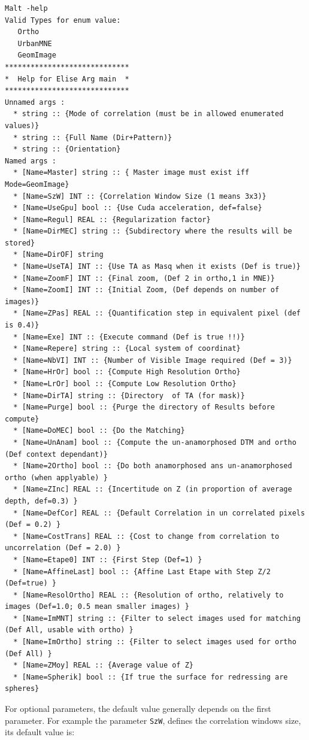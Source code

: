 {\scriptsize
\begin{verbatim}
Malt -help
Valid Types for enum value:
   Ortho
   UrbanMNE
   GeomImage
*****************************
*  Help for Elise Arg main  *
*****************************
Unnamed args :
  * string :: {Mode of correlation (must be in allowed enumerated values)}
  * string :: {Full Name (Dir+Pattern)}
  * string :: {Orientation}
Named args :
  * [Name=Master] string :: { Master image must exist iff Mode=GeomImage}
  * [Name=SzW] INT :: {Correlation Window Size (1 means 3x3)}
  * [Name=UseGpu] bool :: {Use Cuda acceleration, def=false}
  * [Name=Regul] REAL :: {Regularization factor}
  * [Name=DirMEC] string :: {Subdirectory where the results will be stored}
  * [Name=DirOF] string
  * [Name=UseTA] INT :: {Use TA as Masq when it exists (Def is true)}
  * [Name=ZoomF] INT :: {Final zoom, (Def 2 in ortho,1 in MNE)}
  * [Name=ZoomI] INT :: {Initial Zoom, (Def depends on number of images)}
  * [Name=ZPas] REAL :: {Quantification step in equivalent pixel (def is 0.4)}
  * [Name=Exe] INT :: {Execute command (Def is true !!)}
  * [Name=Repere] string :: {Local system of coordinat}
  * [Name=NbVI] INT :: {Number of Visible Image required (Def = 3)}
  * [Name=HrOr] bool :: {Compute High Resolution Ortho}
  * [Name=LrOr] bool :: {Compute Low Resolution Ortho}
  * [Name=DirTA] string :: {Directory  of TA (for mask)}
  * [Name=Purge] bool :: {Purge the directory of Results before compute}
  * [Name=DoMEC] bool :: {Do the Matching}
  * [Name=UnAnam] bool :: {Compute the un-anamorphosed DTM and ortho (Def context dependant)}
  * [Name=2Ortho] bool :: {Do both anamorphosed ans un-anamorphosed ortho (when applyable) }
  * [Name=ZInc] REAL :: {Incertitude on Z (in proportion of average depth, def=0.3) }
  * [Name=DefCor] REAL :: {Default Correlation in un correlated pixels (Def = 0.2) }
  * [Name=CostTrans] REAL :: {Cost to change from correlation to uncorrelation (Def = 2.0) }
  * [Name=Etape0] INT :: {First Step (Def=1) }
  * [Name=AffineLast] bool :: {Affine Last Etape with Step Z/2 (Def=true) }
  * [Name=ResolOrtho] REAL :: {Resolution of ortho, relatively to images (Def=1.0; 0.5 mean smaller images) }
  * [Name=ImMNT] string :: {Filter to select images used for matching (Def All, usable with ortho) }
  * [Name=ImOrtho] string :: {Filter to select images used for ortho (Def All) }
  * [Name=ZMoy] REAL :: {Average value of Z}
  * [Name=Spherik] bool :: {If true the surface for redressing are spheres}
\end{verbatim}
}

For  optional parameters, the default value generally depends on the first
parameter. For example the parameter {\tt SzW}, defines the correlation
windows size, its default value is:


